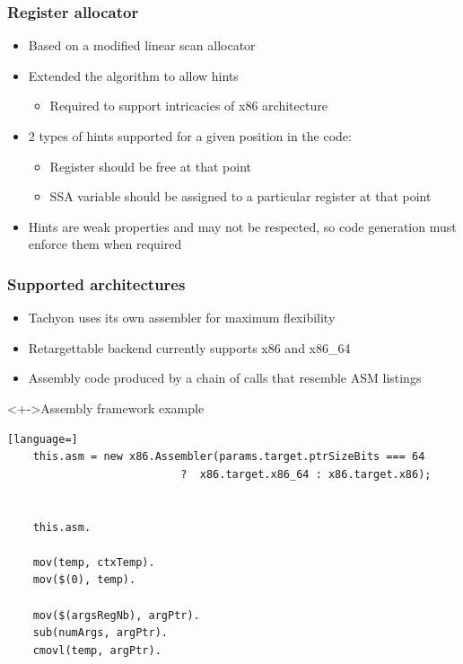 \begin{frame}
\frametitle{\bf Register allocator}

\begin{itemize}
    \item Based on a modified linear scan allocator
    \item Extended the algorithm to allow hints
    \begin{itemize}
        \item Required to support intricacies of x86 architecture
    \end{itemize}
    \item 2 types of hints supported for a given position in the code:
    \begin{itemize}
        \item Register should be free at that point
        \item SSA variable should be assigned to a particular register at that point
    \end{itemize}
    \item Hints are weak properties and may not be respected, so code generation must enforce
    them when required
\end{itemize}
\end{frame}

\begin{frame}[fragile]
\frametitle{\bf Supported architectures}

\begin{itemize}
    \item Tachyon uses its own assembler for maximum flexibility
    \item Retargettable backend currently supports x86 and x86\_64
    \item Assembly code produced by a chain of calls that resemble ASM
    listings
\end{itemize}

\begin{block}<+->{Assembly framework example}
\begin{lstlisting}[language=]
    this.asm = new x86.Assembler(params.target.ptrSizeBits === 64
                           ?  x86.target.x86_64 : x86.target.x86);


    this.asm.

    mov(temp, ctxTemp).
    mov($(0), temp).
    
    mov($(argsRegNb), argPtr).
    sub(numArgs, argPtr).
    cmovl(temp, argPtr).
\end{lstlisting}
\end{block}
\end{frame}

